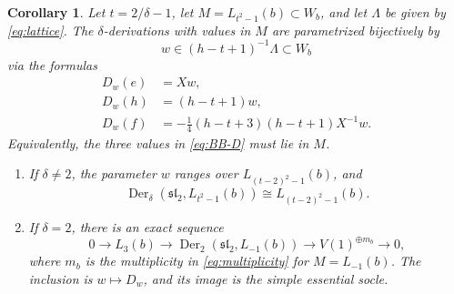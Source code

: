 \documentclass[11pt,reqno]{amsart}
\numberwithin{equation}{section}
\newcommand{\s}{\mathfrak{sl}_2}
\DeclareMathOperator{\Der}{Der}
\newtheorem{corollary}[theorem]{Corollary}
\theoremstyle{definition}
\theoremstyle{remark}
\begin{document}
\begin{corollary}\label{cor:block-modules}
Let \(t=2/\delta-1\), let \(M=L_{t^2-1}(b)\subset W_b\),
and let \(\Lambda\) be given by \eqref{eq:lattice}.
The \(\delta\)-derivations with values in \(M\) are parametrized
bijectively by
\begin{equation}\label{eq:BB-parameters}
w\in(h-t+1)^{-1}\Lambda\subset W_b
\end{equation}
via the formulas
\begin{equation}\label{eq:BB-D}
\begin{aligned}
D_w(e)&=Xw,\\
D_w(h)&=(h-t+1)w,\\
D_w(f)&=-\frac{1}{4}(h-t+3)(h-t+1)X^{-1}w.
\end{aligned}
\end{equation}
Equivalently, the three values in \eqref{eq:BB-D} must lie in \(M\).
\begin{enumerate}
\item If \(\delta\ne2\), the parameter \(w\) ranges over
\(L_{(t-2)^2-1}(b)\), and
\begin{equation}\label{eq:BB-simple}
\Der_\delta(\s,L_{t^2-1}(b))\cong L_{(t-2)^2-1}(b).
\end{equation}
\item If \(\delta=2\), there is an exact sequence
\begin{equation}\label{eq:BB-extension}
0\longrightarrow L_3(b)\longrightarrow
\Der_2(\s,L_{-1}(b))\longrightarrow V(1)^{\oplus m_b}
\longrightarrow0,
\end{equation}
where \(m_b\) is the multiplicity in \eqref{eq:multiplicity}
for \(M=L_{-1}(b)\). The inclusion is \(w\mapsto D_w\),
and its image is the simple essential socle.
\end{enumerate}
\end{corollary}
\end{document}
